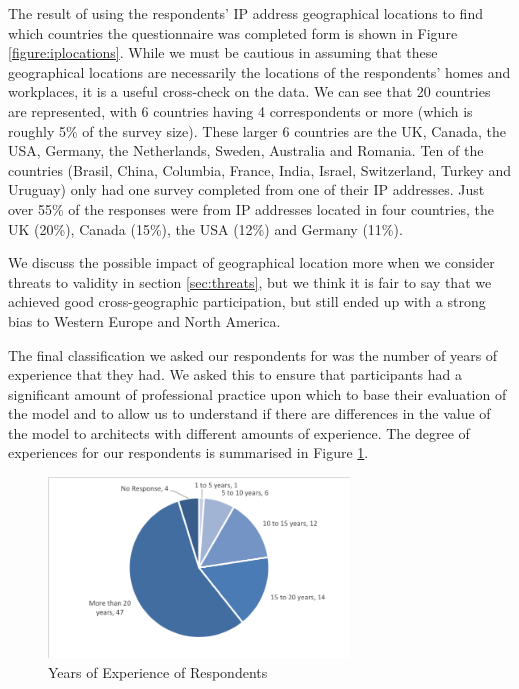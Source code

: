 The result of using the respondents' IP address geographical locations to find which countries the questionnaire was completed form is shown in Figure \ref{figure:iplocations}.  While we must be cautious in assuming that these geographical locations are necessarily the locations of the respondents' homes and workplaces, it is a useful cross-check on the data.  We can see that 20 countries are represented, with 6 countries having 4 correspondents or more (which is roughly 5\% of the survey size).  These larger 6 countries are the UK, Canada, the USA, Germany, the Netherlands, Sweden, Australia and Romania.  Ten of the countries (Brasil, China, Columbia, France, India, Israel, Switzerland, Turkey and Uruguay) only had one survey completed from one of their IP addresses.  Just over 55\% of the responses were from IP addresses located in four countries, the UK (20\%), Canada (15\%), the USA (12\%) and Germany (11\%).

We discuss the possible impact of geographical location more when we consider threats to validity in section \ref{sec:threats}, but we think it is fair to say that we achieved good cross-geographic participation, but still ended up with a strong bias to Western Europe and North America.

The final classification we asked our respondents for was the number of years of experience that they had.  We asked this to ensure that participants had a significant amount of professional practice upon which to base their evaluation of the model and to allow us to understand if there are differences in the value of the model to architects with different amounts of experience.  The degree of experiences for our respondents is summarised in Figure \ref{figure:yearsexp}.
 
\begin{figure}
\centering
\includegraphics[width=8cm,trim={2 2 2 2},clip]{Figures/prioritisation-yearsexp-detailed}
\caption{Years of Experience of Respondents}
\label{figure:yearsexp}
\end{figure}

